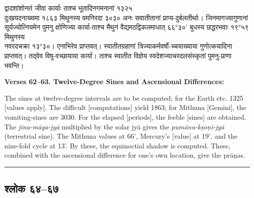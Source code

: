 \documentclass[11pt,a4paper]{article}
\newcommand{\longline}{\noindent\rule{\textwidth}{0.4pt}}
\newcommand{\dev}[1]{{\devanagarifont #1}}
\newcommand{\sectsep}{\par\vspace{0.8em}\longline\vspace{0.8em}}
\begin{document}
\begin{minipage}[t]{0.48\textwidth}
\small\devanagarifont
द्वादशांशोनतं जीवा कार्याः ताश्च भूतादिनगमनानां १३२५\\
दुःखयदनाख्यमा १८६३ मिथुनस्य वमनिरदा ३०३० अनः सवातीतानां प्राप्य-दुर्बलतीर्थाः। जिनमागज्यागुणानां सूर्यज्योत्नियमेन पुमनु क्षोणिज्या कार्या-ताश्च मैथुनं वैद्यमठद्विकलमाधात् ६६°३०' बुधस्य छद्धरभवाः १९°५९ मिथुनस्य\\
नवरदचक्रा १३°३०। एनाभिरेव प्राप्तवत्। स्वातीतग्रहाणां त्रिज्याकर्मवर्षो-च्चयाख्याया गुणोत्कयादिना प्राप्तवत्। तद्‌वेव विषु-वच्छायाया कार्या। ताश्च स्वातीत विज्ञेय स्वदेशज्याचरदलसंस्कृतां पुमनु-प्राणा भवन्ति।
\end{minipage}%
\hfill
\begin{minipage}[t]{0.48\textwidth}
\small
\textbf{Verses 62--63. Twelve-Degree Sines and Ascensional Differences:}

The sines at twelve-degree intervals are to be computed; for the Earth etc. 1325 [values apply]. The difficult [computations] yield 1863; for Mithuna [Gemini], the vomiting-sines are 3030. For the elapsed [periods], the feeble [sines] are obtained. The \textit{jina-m\=aga-jy\=a} multiplied by the solar jy\=a gives the \textit{pum\=anu-k\d{s}o\d{n}i-jy\=a} (terrestrial sine). The Mithuna values at 66', Mercury's [value] at 19', and the nine-fold cycle at 13'. By these, the equinoctial shadow is computed. These, combined with the ascensional difference for one's own location, give the pr\=a\d{n}as.
\end{minipage}

\sectsep

\subsection{\dev{श्लोक ६४--६७}}
\end{document}

